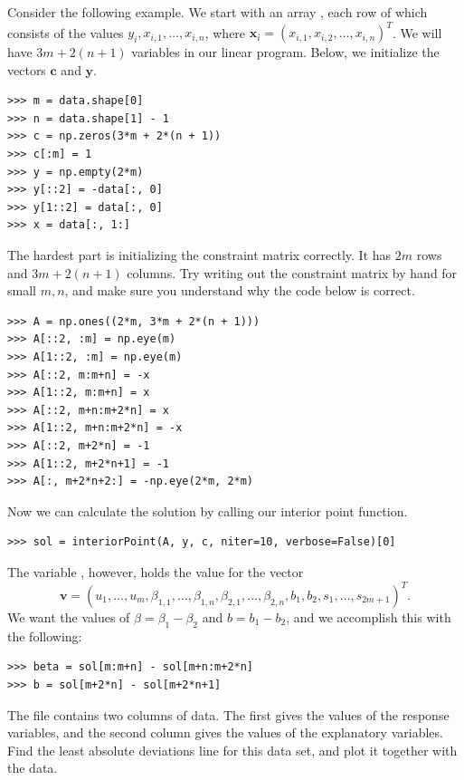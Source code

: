 Consider the following example.
We start with an array , each row of which consists of the values $y_i, x_{i,1},\ldots,x_{i,n}$, where $\mathbf{x}_i = (x_{i,1}, x_{i,2}, \ldots, x_{i,n})^T$.
We will have $3m + 2(n+1)$ variables in our linear program.
Below, we initialize the vectors $\mathbf{c}$ and $\mathbf{y}$.
\begin{lstlisting}
>>> m = data.shape[0]
>>> n = data.shape[1] - 1
>>> c = np.zeros(3*m + 2*(n + 1))
>>> c[:m] = 1
>>> y = np.empty(2*m)
>>> y[::2] = -data[:, 0]
>>> y[1::2] = data[:, 0]
>>> x = data[:, 1:]
\end{lstlisting}

The hardest part is initializing the constraint matrix correctly.
It has $2m$ rows and $3m + 2(n+1)$ columns.
Try writing out the constraint matrix by hand for small $m, n$, and make sure you understand why the code below is correct.
\begin{lstlisting}
>>> A = np.ones((2*m, 3*m + 2*(n + 1)))
>>> A[::2, :m] = np.eye(m)
>>> A[1::2, :m] = np.eye(m)
>>> A[::2, m:m+n] = -x
>>> A[1::2, m:m+n] = x
>>> A[::2, m+n:m+2*n] = x
>>> A[1::2, m+n:m+2*n] = -x
>>> A[::2, m+2*n] = -1
>>> A[1::2, m+2*n+1] = -1
>>> A[:, m+2*n+2:] = -np.eye(2*m, 2*m)
\end{lstlisting}

Now we can calculate the solution by calling our interior point function.
\begin{lstlisting}
>>> sol = interiorPoint(A, y, c, niter=10, verbose=False)[0]
\end{lstlisting}

The variable , however, holds the value for the vector
\[
\mathbf{v} = (u_1,\ldots, u_m, \beta_{1,1},\ldots, \beta_{1,n}, \beta_{2,1},\ldots, \beta_{2,n}, b_1, b_2, s_1,\ldots,s_{2m+1})^T.
\]
We want the values of $\beta = \beta_1-\beta_2$ and $b = b_1 - b_2$, and we accomplish this with the following:
\begin{lstlisting}
>>> beta = sol[m:m+n] - sol[m+n:m+2*n]
>>> b = sol[m+2*n] - sol[m+2*n+1]
\end{lstlisting}

\begin{problem} %
The file  contains two columns of data.
The first gives the values of the response variables, and the second column gives the values of the explanatory variables.
Find the least absolute deviations line for this data set, and plot it together with the data.
\end{problem}
